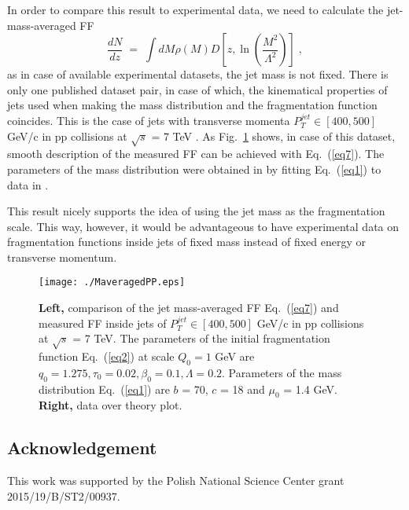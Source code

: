 \documentclass{appolb}
\newcommand{\be}{\begin{equation}}
\newcommand{\ee}[1]{\label{#1} \end{equation}}
\begin{document}
In order to compare this result to experimental data, we need to calculate the jet-mass-averaged FF
\be
\frac{dN}{dz} \;=\; 
\int dM \rho(M) D\left[z,\ln\left(\frac{M^2}{\Lambda^2}\right)\right]\;,
\ee{eq7}
as in case of available experimental datasets, the jet mass is not fixed. There is only one published dataset pair, in case of which, the kinematical properties of jets used when making the mass distribution and the fragmentation function coincides. This is the case of jets with transverse momenta $P^{jet}_T \in [400, 500]$ GeV/c in pp collisions at $\sqrt s$ = 7 TeV \cite{bib:atlasM,bib:atlasFFpp7TeV}. As Fig.~\ref{fig:MassAver} shows, in case of this dataset, smooth description of the measured FF can be achieved with Eq.~(\ref{eq7}). The parameters of the mass distribution were obtained in \cite{bib:UKpp3D} by fitting Eq.~(\ref{eq1}) to data in \cite{bib:atlasM}.

This result nicely supports the idea of using the jet mass as the fragmentation scale. This way, however, it would be advantageous to have experimental data on fragmentation functions inside jets of fixed mass instead of fixed energy or transverse momentum.   



\begin{figure}%
\begin{center}
\texttt{[image: ./MaveragedPP.eps]} 
\end{center}
\caption{\textbf{Left,} comparison of the jet mass-averaged FF Eq.~(\ref{eq7}) and measured FF inside jets of $P^{jet}_T \in [400, 500]$ GeV/c in pp collisions at $\sqrt s$ = 7 TeV. The parameters of the initial fragmentation function Eq.~(\ref{eq2}) at scale $Q_0 = 1$ GeV are $q_0 = 1.275, \tau_0 = 0.02, \beta_0 = 0.1, \Lambda = 0.2$. Parameters of the mass distribution Eq.~(\ref{eq1}) are $b$ = 70, $c$ = 18 and $\mu_0$ = 1.4 GeV. \textbf{Right,} data over theory plot.
\label{fig:MassAver}}
\end{figure}













\subsection{Acknowledgement}
This work was supported by the Polish National Science Center grant 2015/19/B/ST2/00937.
 
%

%


\end{document}
